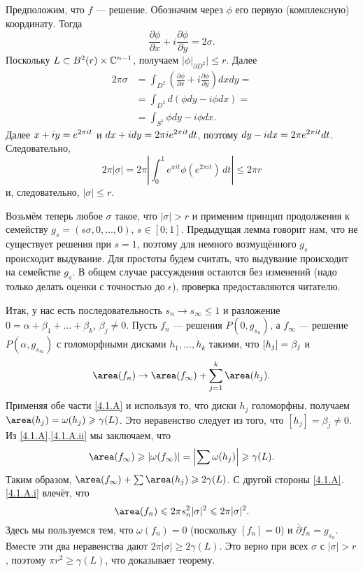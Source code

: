 Предположим, что $f$ — решение.
Обозначим через $\phi$ его первую (комплексную) координату.
Тогда 
\[\frac{\partial\phi}{\partial x}+i\frac{\partial\phi}{\partial y} = 2\sigma.\]
Поскольку $L \subset B^2 (r) \times \mathbb{C}^{n-1}$, получаем $\bigl|\phi|_{\partial D^2}\bigr|\le r$.
Далее
\begin{align*}
2\pi\sigma &= \int_{D^2}\left(\frac{\partial\phi}{\partial x}+i\frac{\partial\phi}{\partial y}\right)dxdy =
\\
&=\int_{D^2} d (\phi dy - i\phi dx)  = 
\\
&=\int_{S^1}\phi dy - i\phi dx.
\end{align*}
Далее $x + iy \z= e^{2\pi i t}$ и $dx + idy \z= 2\pi i e^{2\pi it} dt$, поэтому $dy - idx \z= 2\pi e^{2\pi i t} dt$.
Следовательно,
\[2\pi | \sigma | 
= 
2\pi\left|\int_0^1  e^{\pi i t} \phi(e^{2\pi i t})\,dt\right|
\le
2\pi r \]
и, следовательно, $| \sigma | \le r$.
\qeds


Возьмём теперь любое $\sigma$ такое, что $|\sigma|>r$ и применим принцип продолжения к семейству $g_s = (s\sigma, 0 ,\dots, 0)$, $s \in [0;1]$.
Предыдущая лемма говорит нам, что не существует решения при $s = 1$, поэтому для немного возмущённого $g_s$ происходит выдувание.
Для простоты будем считать, что выдувание происходит на семействе $g_s$.
В общем случае рассуждения остаются без изменений (надо только делать оценки с точностью до $\epsilon$), проверка предоставляются читателю.

Итак, у нас есть последовательность $s_n \to s_\infty \le 1$ и разложение $0 = \alpha + \beta_1 +\dots+ \beta_k$, $\beta_j \ne 0$.
Пусть $f_n$ — решения $P (0, g_{s_n})$, а $f_\infty$ — решение $P
(\alpha, g_{s_\infty})$ с голоморфными дисками $h_1,\dots,h_k$ такими, что $[h_j] \z= \beta_j$ и
\[\area (f_n)
\to 
\area (f_\infty) + \sum_{j=1}^k\area (h_j).\]
Применяя обе части \ref{4.1.A} и используя то, что диски $h_j$
голоморфны, получаем
$\area (h_j) = \omega (h_j) \ge \gamma (L)$.
Это неравенство следует из того, что $[h_j] = \beta_j \ne 0$.
Из \ref{4.1.A}.\ref{4.1.A.ii} мы заключаем, что 
\[\area (f_\infty)
\ge
|\omega(f_\infty)|
=
\left|\sum\omega (h_j)\right|
\ge
\gamma(L).\]
Таким образом, $\area (f_\infty) + \sum \area (h_j) \ge 2\gamma (L)$.
С другой стороны \ref{4.1.A}.\ref{4.1.A.i} влечёт, что 
\[\area(f_n)
\le
2\pi s^2_n|\sigma|^2
\le
2\pi|\sigma|^2.
\]
Здесь мы пользуемся тем, что $\omega (f_n) = 0$ (поскольку $[f_n] = 0$) и $\bar\partial f_n=g_{s_n}$.
Вместе эти два неравенства дают $2\pi | \sigma | \ge 2\gamma (L)$.
Это верно при всех $\sigma$ с $| \sigma | > r$, поэтому $\pi r^2 \ge \gamma (L)$, что доказывает теорему.
\qeds

